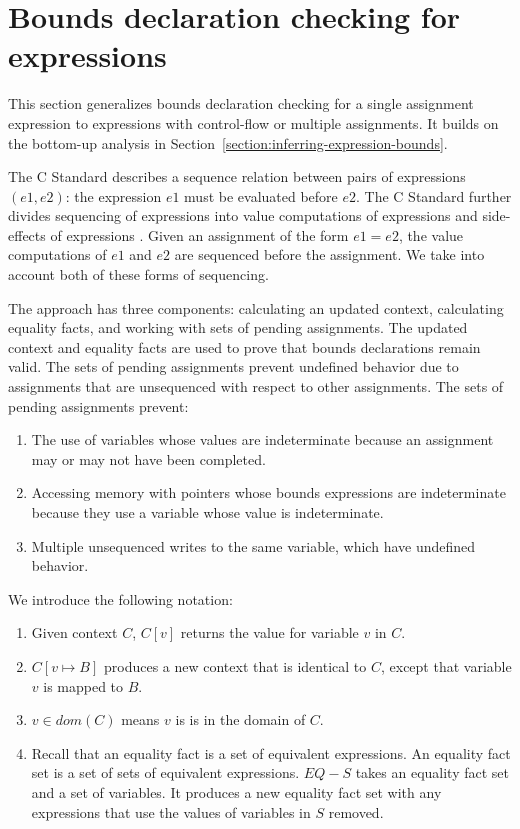 \section{Bounds declaration checking for expressions}

\label{section:checking-assignment-expressions}
\label{section:checking-nested-assignment-expressions}

This section generalizes bounds declaration checking for a single
assignment expression to expressions with control-flow or multiple
assignments.
It builds on the bottom-up analysis in
Section~\ref{section:inferring-expression-bounds}.

The C Standard \cite[Section 5.1.2.3]{ISO2011}
describes a sequence relation between pairs of expressions $(e1, e2)$:
the expression $e1$ must be evaluated before $e2$.  
The C Standard
further divides sequencing of expressions into value computations
of expressions and side-effects of expressions \cite[Section 6.5, pars. 1,2]{ISO2011}.
Given an assignment of the form $e1 = e2$, 
the value computations of $e1$ and $e2$ are sequenced before the
assignment. We take into account both of these forms of sequencing.

The approach has three components: calculating an updated context,
calculating equality facts, and working with sets of pending assignments.
The updated context and equality facts are used to prove that bounds
declarations remain valid.  The sets of pending assignments prevent 
undefined behavior due to assignments that are unsequenced with respect
to other assignments.   The sets of pending assignments prevent:
\begin{enumerate}
\item The use of variables whose values are
indeterminate because an assignment may or may not have been completed.
\item Accessing memory with pointers whose bounds expressions
are indeterminate because they use a variable whose value is indeterminate.
\item Multiple unsequenced writes to the  same variable, which have undefined behavior.
\end{enumerate}

We introduce the following notation:
\begin{enumerate}
\item Given context $C$, $C[v]$ returns the value for variable $v$ in $C$.
\item $C[v \mapsto B]$ produces a new context that is identical to $C$,
except that variable $v$ is mapped to $B$.
\item $v \in dom(C)$ means $v$ is is in the domain of $C$.
\item Recall that an equality fact is a set of equivalent expressions.  An 
equality fact set is a set of sets of equivalent expressions.  $EQ - S$ takes
an equality fact set and a set of variables.  It produces a new equality fact
set with any expressions that use the values of variables in $S$ removed.
\end{enumerate}

